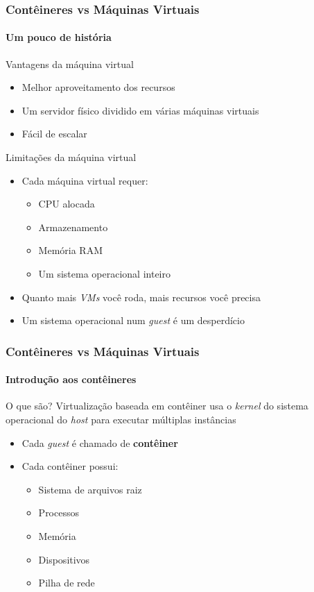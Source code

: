 \documentclass[12pt]{beamer}
\begin{document}
\begin{frame}
  \frametitle{Contêineres vs Máquinas Virtuais}
  \framesubtitle{Um pouco de história}
	\begin{block}{Vantagens da máquina virtual}
	\begin{itemize}
		\item Melhor aproveitamento dos recursos
		\pause
		\item Um servidor físico dividido em várias máquinas virtuais
		\pause
		\item Fácil de escalar
		\pause
	\end{itemize}
  \end{block}
	\begin{block}{Limitações da máquina virtual}
		\begin{itemize}
			\item Cada máquina virtual requer:
			\pause
				\begin{itemize}
				\item CPU alocada
				\pause
				\item Armazenamento
				\pause
				\item Memória RAM
				\pause
				\item Um sistema operacional inteiro
			\end{itemize}
			\pause
			\item Quanto mais \emph{VMs} você roda, mais recursos você precisa
			\pause
			\item Um sistema operacional num \emph{guest} é um desperdício
		\end{itemize}
	\end{block}
\end{frame}
\begin{frame}
  \frametitle{Contêineres vs Máquinas Virtuais}
  \framesubtitle{Introdução aos contêineres}
	\begin{block}{O que são?}
					Virtualização baseada em contêiner usa o \emph{kernel} do sistema
					operacional do \emph{host} para executar múltiplas instâncias
	\end{block}
	\begin{block}{}
	\begin{itemize}
		\item Cada \emph{guest} é chamado de \textbf{contêiner}
		\pause
		\item Cada contêiner possui:
		\pause
			\begin{itemize}
				\item Sistema de arquivos raiz
				\pause
				\item Processos
				\pause
				\item Memória
				\pause
				\item Dispositivos
				\pause
				\item Pilha de rede
			\end{itemize}
	\end{itemize}
	\end{block}
\end{frame}
\end{document}
